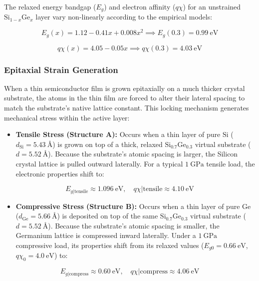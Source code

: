 \documentclass[
]{article}
\providecommand{\tightlist}{%
  \setlength{\itemsep}{0pt}\setlength{\parskip}{0pt}}
\begin{document}
The relaxed energy bandgap (\(E_g\)) and electron affinity (\(q\chi\))
for an unstrained \(\text{Si}_{1-x}\text{Ge}_x\) layer vary non-linearly
according to the empirical models:

\[E_g(x) = 1.12 - 0.41x + 0.008x^2 \implies E_g(0.3) = 0.99\ \text{eV}\]

\[q\chi(x) = 4.05 - 0.05x \implies q\chi(0.3) = 4.03\ \text{eV}\]

\subsubsection{Epitaxial Strain
Generation}\label{epitaxial-strain-generation}

When a thin semiconductor film is grown epitaxially on a much thicker
crystal substrate, the atoms in the thin film are forced to alter their
lateral spacing to match the substrate's native lattice constant. This
locking mechanism generates mechanical stress within the active layer:

\begin{itemize}
\tightlist
\item
  \textbf{Tensile Stress (Structure A):} Occurs when a thin layer of
  pure \(\text{Si}\) (\(d_{\text{Si}} = 5.43\ \text{Å}\)) is grown on
  top of a thick, relaxed \(\text{Si}_{0.7}\text{Ge}_{0.3}\) virtual
  substrate (\(d = 5.52\ \text{Å}\)). Because the substrate's atomic
  spacing is larger, the Silicon crystal lattice is pulled outward
  laterally. For a typical \(1\ \text{GPa}\) tensile load, the
  electronic properties shift to:
\end{itemize}

\[E_{g|\text{tensile}} \approx 1.096\ \text{eV}, \quad q\chi|\text{tensile} \approx 4.10\ \text{eV}\]

\begin{itemize}
\tightlist
\item
  \textbf{Compressive Stress (Structure B):} Occurs when a thin layer of
  pure \(\text{Ge}\) (\(d_{\text{Ge}} = 5.66\ \text{Å}\)) is deposited
  on top of the same \(\text{Si}_{0.7}\text{Ge}_{0.3}\) virtual
  substrate (\(d = 5.52\ \text{Å}\)). Because the substrate's atomic
  spacing is smaller, the Germanium lattice is compressed inward
  laterally. Under a \(1\ \text{GPa}\) compressive load, its properties
  shift from its relaxed values (\(E_{g0}=0.66\ \text{eV}\),
  \(q\chi_0=4.0\ \text{eV}\)) to:
\end{itemize}

\[E_{g|\text{compress}} \approx 0.60\ \text{eV}, \quad q\chi|\text{compress} \approx 4.06\ \text{eV}\]
\end{document}
